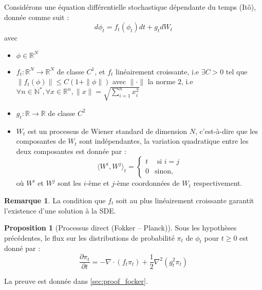 \documentclass[a4paper,10pt]{article}
\theoremstyle{definition} %
\theoremstyle{definition} %
\newtheorem{proposition}[definition]{Proposition}
\theoremstyle{definition} %
\theoremstyle{definition} %
\newtheorem{remark}[definition]{Remarque}
\newcommand{\R}{\mathbb{R}}
\newcommand{\N}{\mathbb{N}}
\begin{document}
Considérons une équation différentielle stochastique dépendante du temps (Itô), donnée comme suit :
    \begin{equation}\label{eq:SDE}
         d\phi_t = f_t(\phi_t)dt + g_tdW_t
    \end{equation}
    avec 
    \begin{itemize}
        \item $\phi \in \R^N$
        \item $f_t:\R^N \rightarrow \R^N$ de classe $C^1$, et $f_t$ linéairement croissante, i.e $\exists C > 0$ tel que $\|f_t(\phi)\| \leq C(1+\| \phi \|)$ avec $\| \cdot \|$ la norme $2$, i.e $ \forall n \in \N^*, \forall x \in \R^n,  \| x \| = \sqrt{\sum\limits_{i=1}^n x_i^2}$
        \item $g_t : \R \rightarrow \R$ de classe $C^2$
        \item $W_t$ est un processus de Wiener standard de dimension $N$, c'est-à-dire que les composantes de $W_t$ sont indépendantes, la variation quadratique entre les deux composantes est donnée par :
            \begin{equation*}
                \langle W^i, W^j \rangle_t =
                    \begin{cases}    
                        t & \textrm{ si } i=j \\
                        0 & \textrm{sinon},
                    \end{cases}
            \end{equation*}
            où $W^i$ et $W^j$ sont les $i$-ème et $j$-ème coordonnées de $W_t$ respectivement. 
    \end{itemize}
    \begin{remark}
        La condition que $f_t$ soit au plus linéairement croissante garantit l'existence d'une solution à la SDE.
    \end{remark}

\begin{proposition}[Processus direct (Fokker – Planck)\label{prop:fokker}] 
Sous les hypothèses précédentes, le flux sur les distributions de probabilité $\pi_t$ de $\phi_t$ pour $t \geq 0$ est donné par :
    \begin{equation}\label{eq:Fokker-Planck}
        \frac{\partial\pi_t}{\partial t} = -\nabla \cdot (f_t \pi_t) + \frac{1}{2}\nabla^2(g_t^2\pi_t)
    \end{equation}
\end{proposition}
La preuve est donnée dans \cref{sec:proof_focker}.
\end{document}
